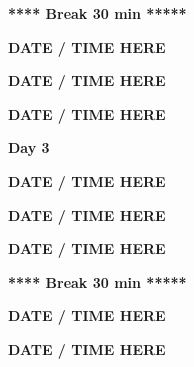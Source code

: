 \documentclass[12pt]{extbook}
\newcommand{\dayheader}[1]{
\clearpage
\begin{center}
\Large\bfseries Day #1
\end{center}
\bigskip}
\newcommand{\breaktime}[1]{
\bigskip
\begin{center}
\Large\bfseries ***** Break #1 *****
\end{center}
\bigskip}
\newcommand{\abstract}[2]{{
\bigskip
\begin{center}
\bfseries #1
\end{center}}
\par
}
\begin{document}
\breaktime{30 min}

\abstract{DATE / TIME HERE}{abstracts/Brennwald} %
\abstract{DATE / TIME HERE}{abstracts/Blanc} %
\abstract{DATE / TIME HERE}{abstracts/Marion} %











\dayheader{3}

\abstract{DATE / TIME HERE}{abstracts/Musy} %
\abstract{DATE / TIME HERE}{abstracts/Zhao} %
\abstract{DATE / TIME HERE}{abstracts/GroegerTrampe} %

\breaktime{30 min}


\abstract{DATE / TIME HERE}{abstracts/Iwe} %
\abstract{DATE / TIME HERE}{abstracts/Slagter} %









\end{document}
